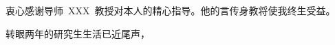 \begin{acknowledgements}
衷心感谢导师~XXX~教授对本人的精心指导。他的言传身教将使我终生受益。

转眼两年的研究生生活已近尾声，

\end{acknowledgements}

